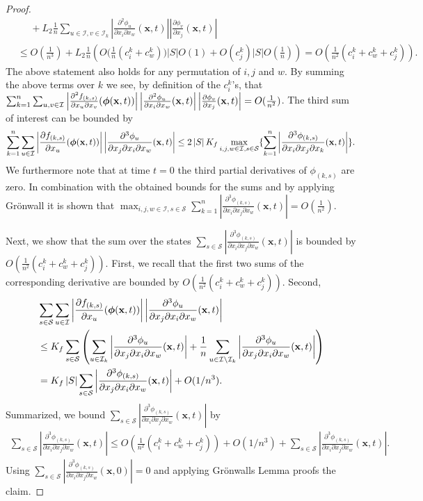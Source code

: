 \documentclass[acmsmall]{acmart}
\newcommand\bx{\mathbf{x}}
\newcommand\bphi{\text{\boldmath$\phi$}}
\newcommand\calI{\mathcal{I}}
\newcommand\calS{\mathcal{S}}
\newcommand\abs[1]{\left|#1\right|}         %
\newcommand{\ddd}[4]{ \frac{\partial^3 #1 }{ \partial x_{#2} \partial x_{#3} \partial x_{#4} }}
\newcommand{\dd}[3]{ \frac{\partial^2 #1 }{ \partial x_{#2} \partial x_{#3}}}
\begin{document}
\begin{proof}
\begin{align*}
& \phantom{\leq} + L_{2}\frac{1}{n} \sum_{u\in \calI,v \in \calI_k} \abs{\dd{\phi_{u}}{i}{w}(\bx,t)} \abs{\frac{\partial \phi_{v}}{\partial x_j}(\bx,t)} \\
& \leq O(\frac{1}{n^3}) + L_{2}\frac{1}{n}\left( O\bigl(\frac{1}{n}(c^k_{i} + c^k_{w})\bigr)\abs{S}O(1) + O(c^k_{j})\abs{S}O(\frac{1}{n}) \right)
 = O\left(\frac{1}{n^2}(c^k_{i} + c^k_{w} + c^k_{j})\right).
\end{align*}
The above statement also holds for any permutation of $i,j$ and $w$. By summing the above terms over $k$ we see, by definition of the $c^k_{i}$'s, that $\sum_{k=1}^n\sum_{u,v \in \calI} \abs{\dd{f_{(k,s)}}{u}{v}(\bphi (\bx,t))} \abs{\dd{\phi_{u}}{i}{w}(\bx,t)} \abs{\frac{\partial \phi_{v}}{\partial x_j}(\bx,t)} = O(\frac{1}{n^2})$. The third sum of interest can be bounded by
\begin{align*}
 \sum_{k=1}^{n} \sum_{u \in \calI} \abs{\frac{\partial f_{(k,s)}}{\partial x_u}(\bphi (\bx,t))} \abs{\ddd{\phi_{u}}{j}{i}{w}(\bx,t)} \leq 2 \abs{S} K_f \max_{i,j,w\in \calI,s\in \calS} \{ \sum_{k=1}^{n} \abs{\ddd{\phi_{(k,s)}}{i}{j}{k}(\bx,t)} \}.
\end{align*}
We furthermore note that at time $t{=}0$ the third partial derivatives of $\phi_{(k,s)}$ are zero. In combination with the obtained bounds for the sums and by applying Grönwall it is shown that $\max_{i,j,w \in \calI,s \in \calS} \sum_{k=1}^{n} \abs{\ddd{\phi_{(k,s)}}{i}{j}{w}(\bx,t)} = O(\frac{1}{n^2})$. 

Next, we show that the sum over the states $\sum_{s\in \calS} \abs{\ddd{\phi_{(k,s)}}{i}{j}{w}(\bx,t)}$ is bounded by \\ $O\left(\frac{1}{n^2}(c^k_{i} + c^k_{w} + c^k_{j}) \right)$. First, we recall that the first two sums of the corresponding derivative are bounded by $O\left( \frac{1}{n^2}(c^k_{i} + c^k_{w} + c^k_{j}) \right)$. Second, 
\begin{align*}
& \sum_{s\in \calS} \sum_{u \in \calI} \abs{\frac{\partial f_{(k,s)}}{\partial x_u}(\bphi (\bx,t))} \abs{\ddd{\phi_{u}}{j}{i}{w}(\bx,t)} \\
& \leq  K_f \sum_{s\in \calS} \left( \sum_{u \in \calI_k} \abs{\ddd{\phi_{u}}{j}{i}{w}(\bx,t)} + \frac{1}{n} \sum_{u \in \calI \setminus \calI_k}  \abs{\ddd{\phi_{u}}{j}{i}{w}(\bx,t)} \right) \\
&  = K_f\abs{S} \sum_{s\in \calS} \abs{\ddd{\phi_{(k,s)}}{j}{i}{w}(\bx,t)} +  O(1/n^3) .
\end{align*}
Summarized, we bound $\sum_{s\in \calS} \abs{\ddd{\phi_{(k,s)}}{i}{j}{w}(\bx,t)}$ by 
\begin{align*}
\sum_{s\in \calS} \abs{\ddd{\phi_{(k,s)}}{i}{j}{w}(\bx,t)} \leq O\left( \frac{1}{n^2}(c^k_{i} + c^k_{w} + c^k_{j}) \right) + O(1/n^3) + \sum_{s\in \calS} \abs{\ddd{\phi_{(k,s)}}{i}{j}{w}(\bx,t)}.
\end{align*}
Using $\sum_{s\in \calS} \abs{\ddd{\phi_{(k,s)}}{i}{j}{w}(\bx,0)} = 0$ and applying Grönwalls Lemma proofs the claim. 


\end{proof}
\end{document}
